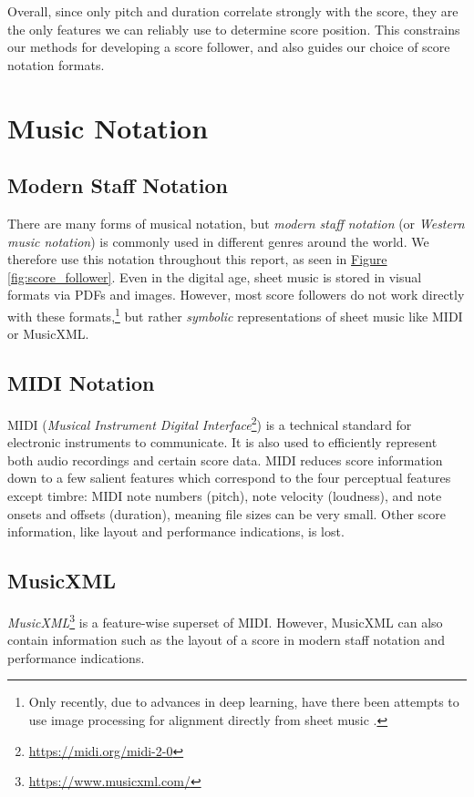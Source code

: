 Overall, since only pitch and duration correlate strongly with the score, they are the only features we can reliably use to determine score position. This constrains our methods for developing a score follower, and also guides our choice of score notation formats.

\section{Music Notation}
\subsection{Modern Staff Notation}
There are many forms of musical notation, but \textit{modern staff notation} (or \textit{Western music notation}) is commonly used in different genres around the world. We therefore use this notation throughout this report, as seen in \hyperref[fig:score_follower]{Figure \ref*{fig:score_follower}}. 
Even in the digital age, sheet music is stored in visual formats via PDFs and images. However, most score followers do not work directly with these formats,\footnote{Only recently, due to advances in deep learning, have there been attempts to use image processing for alignment directly from sheet music \cite{10.3389/fcomp.2021.718340}.} but rather \textit{symbolic} representations of sheet music like MIDI or MusicXML. 

\subsection{MIDI Notation}{\label{subsection:midi}}
MIDI (\textit{Musical Instrument Digital Interface}\footnote{ \href{https://midi.org/midi-2-0}{https://midi.org/midi-2-0}}) is a technical standard for electronic instruments to communicate. It is also used to efficiently represent both audio recordings and certain score data. MIDI reduces score information down to a few salient features which correspond to the four perceptual features except \gls{timbre}: MIDI note numbers (pitch), note velocity (loudness), and note onsets and offsets (duration), meaning file sizes can be very small. Other score information, like layout and performance indications, is lost.

\subsection{MusicXML}
\textit{MusicXML}\footnote{\href{https://www.musicxml.com/}{https://www.musicxml.com/}} is a feature-wise superset of MIDI. However, MusicXML can also contain information such as the layout of a score in modern staff notation and performance indications. 

